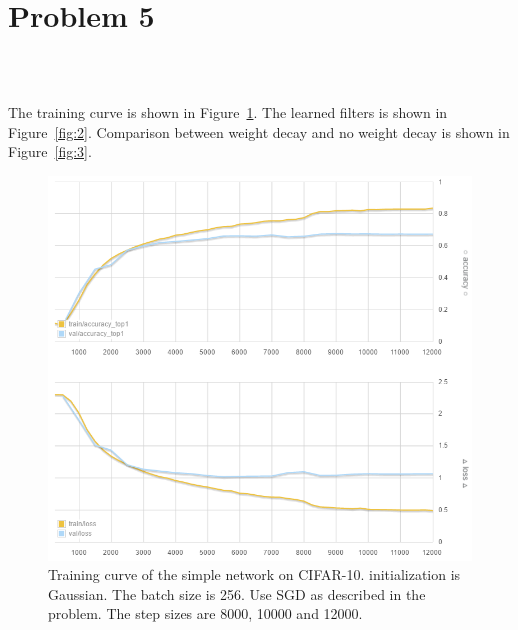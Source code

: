 \section{Problem 5}~\label{sec:prob5}

\subsection{} %

The training curve is shown in Figure~\ref{fig:1}.
The learned filters is shown in Figure~\ref{fig:2}.
Comparison between weight decay and no weight decay is shown in Figure~\ref{fig:3}.

\begin{figure}[ht]
\centering
    \includegraphics[width=0.99\linewidth]{fig/curve1}
    \caption{\small
    Training curve of the simple network on CIFAR-10.
    initialization is Gaussian.
    The batch size is 256.
    Use SGD as described in the problem.
    The step sizes are 8000, 10000 and 12000.}
    \label{fig:1}
\end{figure}

